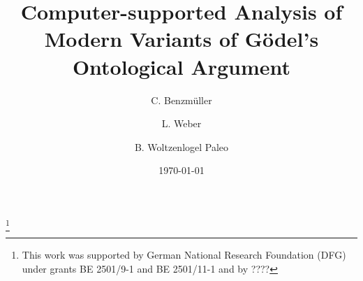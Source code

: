 \documentclass{birkjour}
\theoremstyle{definition}
\theoremstyle{remark}
\numberwithin{equation}{section}
\begin{document}
%
%
%
%
%
%
%
%
%


\title[Modal Collapse]
 {Computer-supported Analysis of Modern Variants of G\"odel's Ontological Argument}



\author[Benzm\"uller]{C. Benzm\"uller}

\address{%
Department of Mathematics and Computer Science\\
Arnimallee 7 \\
Room 115 \\
14195 Berlin \\
Germany
}


\thanks{This work was supported by German National Research Foundation (DFG) under
 grants BE 2501/9-1 and BE 2501/11-1 and by ????}


\author[Weber]{L. Weber}
\address{ 
ToDo \\
ToDo \\
ToDo Berlin \\
Germany
}


\author[Woltzenlogel-Paleo]{B. Woltzenlogel Paleo}
\address{ 
Favoritenstra{\ss}e 9 \\
Room HA0402 \\
1040 Wien \\
Austria
}






\date{\today}
\dedicatory{ }
\end{document}
